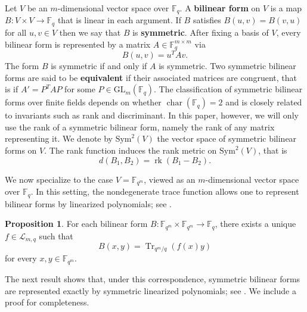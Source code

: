 \documentclass[11pt,a4paper,reqno]{article}
\numberwithin{equation}{section}
\theoremstyle{definition}
\newtheorem{proposition}[theorem]{Proposition}
\begin{document}
Let $V$ be an $m$-dimensional vector space over $\mathbb{F}_q$. A \textbf{bilinear form} on $V$ is a map $B : V \times V \to \mathbb{F}_q$ that is linear in each argument. If $B$ satisfies $B(u,v)=B(v,u)$ for all $u,v \in V$ then we say that $B$ is \textbf{symmetric}. After fixing a basis of \(V\), every bilinear form is represented by a matrix
\(A\in\mathbb F_q^{m\times m}\) via
\[
B(u,v)=u^TAv.
\]
The form \(B\) is symmetric if and only if \(A\) is symmetric.
Two symmetric bilinear forms are said to be \textbf{equivalent} if their associated matrices are congruent, that is if $A' = P^{T}AP$ for some $P \in \mathrm{GL}_m(\mathbb{F}_q)$. 
The classification of symmetric bilinear forms over finite fields depends on
whether \(\operatorname{char}(\mathbb F_q)=2\) and is closely related to
invariants such as rank and discriminant. In this paper, however, we will only
use the rank of a symmetric bilinear form, namely the rank of any matrix
representing it.
We denote by \(\mathrm{Sym}^2(V)\) the vector space of symmetric bilinear forms on \(V\).
The rank function induces the rank metric on \(\mathrm{Sym}^2(V)\), that is
\[
d(B_1,B_2)=\operatorname{rk}(B_1-B_2).
\]

We now specialize to the case \(V=\mathbb F_{q^m}\), viewed as an
\(m\)-dimensional vector space over \(\mathbb F_q\). In this setting, the
nondegenerate trace function allows one to represent bilinear forms by
linearized polynomials; see \cite[Lemma 13]{schmidt2010symmetric}.

\begin{proposition}\label{prop:bilform}
For each bilinear form \(B:\mathbb F_{q^m}\times \mathbb F_{q^m}\to \mathbb F_q\),
there exists a unique~\(f\in\mathcal L_{m,q}\) such that
\[
B(x,y)=\operatorname{Tr}_{q^m/q}(f(x)y)
\]
for every \(x,y\in\mathbb F_{q^m}\).
\end{proposition}

The next result shows that, under this correspondence, symmetric bilinear forms
are represented exactly by symmetric linearized polynomials; see \cite[Section 2.1]{longobardi2020automorphism}. We include a proof for completeness.
\end{document}
